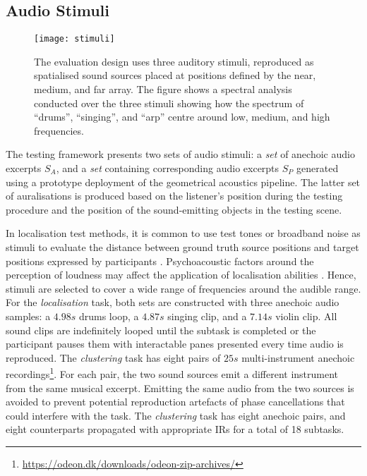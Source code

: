 \subsection{Audio Stimuli}
\begin{figure}[htbp]
    \centering
    \texttt{[image: stimuli]}
    \caption[Visualisation of audio stimuli used in psychoacoustic tests]{The evaluation design uses three auditory stimuli, reproduced as spatialised sound sources placed at positions defined by the near, medium, and far array. The figure shows a spectral analysis conducted over the three stimuli showing how the spectrum of ``drums'', ``singing'', and ``arp'' centre around low, medium, and high frequencies.}\label{fig:stimuli}
\end{figure}
The testing framework presents two sets of audio stimuli: a \emph{set} of anechoic audio excerpts $S_A$, and a \emph{set} containing corresponding audio excerpts $S_P$ generated using a prototype deployment of the geometrical acoustics pipeline. The latter set of auralisations is produced based on the listener's position during the testing procedure and the position of the sound-emitting objects in the testing scene. \par
In localisation test methods, it is common to use test tones or broadband noise as stimuli to evaluate the distance between ground truth source positions and target positions expressed by participants \citep{bertet2013investigation, kashino1998adaptation}. Psychoacoustic factors around the perception of loudness may affect the application of localisation abilities \citep{blauert1997spatial}. Hence, stimuli are selected to cover a wide range of frequencies around the audible range.
For the \emph{localisation} task, both sets are constructed with three anechoic audio samples: a $4.98s$ drums loop, a $4.87s$ singing clip, and a $7.14s$ violin clip. All sound clips are indefinitely looped until the subtask is completed or the participant pauses them with interactable panes presented every time audio is reproduced.
The \emph{clustering} task has eight pairs of $25s$ multi-instrument anechoic recordings\footnote{\url{https://odeon.dk/downloads/odeon-zip-archives/}}. For each pair, the two sound sources emit a different instrument from the same musical excerpt. Emitting the same audio from the two sources is avoided to prevent potential reproduction artefacts of phase cancellations that could interfere with the task. The \emph{clustering} task has eight anechoic pairs, and eight counterparts propagated with appropriate IRs for a total of 18 subtasks.

